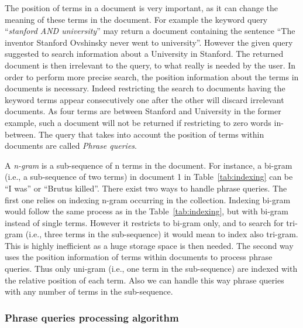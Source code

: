 The position of terms in a document is very important, as it can change the
meaning of these terms in the document. For example the keyword query
``\emph{stanford AND university}'' may return a document containing the
sentence ``The inventor Stanford Ovshinsky never went to university''. However
the given query suggested to search information about a University in
Stanford. The returned document is then irrelevant to the query, to what really
is needed by the user. In order to perform more precise search, the position
information about the terms in documents is necessary. Indeed restricting the
search to documents having the keyword terms appear consecutively one after the
other will discard irrelevant documents. As four terms are between Stanford
and University in the former example, such a document will not be returned if
restricting to zero words in-between. The query that takes into account the
position of terms within documents are called \emph{Phrase queries}.

A \emph{n-gram} is a sub-sequence of n terms in the document. For instance, a
bi-gram (i.e., a sub-sequence of two terms) in document 1 in
Table~\ref{tab:indexing} can be ``I was'' or ``Brutus killed''. There exist
two ways to handle phrase queries. The first one relies on indexing n-gram
occurring in the collection. Indexing bi-gram would follow the same process as
in the Table~\ref{tab:indexing}, but with bi-gram instead of single terms.
However it restricts to bi-gram only, and to search for tri-gram (i.e., three
terms in the sub-sequence) it would mean to index also tri-gram. This is highly
inefficient as a huge storage space is then needed. The second way uses the
position information of terms within documents to process phrase queries. Thus
only uni-gram (i.e., one term in the sub-sequence) are indexed with the relative
position of each term. Also we can handle this way phrase queries with any
number of terms in the sub-sequence.

\subsubsection{Phrase queries processing algorithm}

